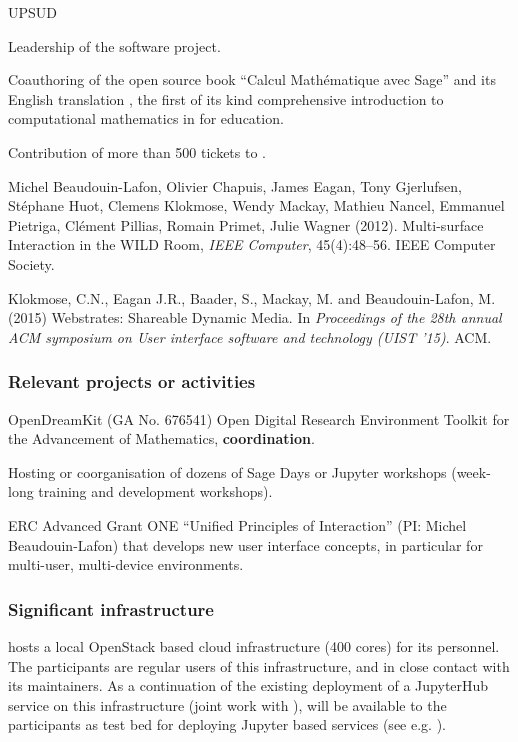 \begin{sitedescription}{UPSUD}
\begin{compactenum}
\item Leadership of the \SageCombinat software project.
\item Coauthoring of the open source book ``Calcul Mathématique avec
  Sage'' and its English translation , the first of its kind
  comprehensive introduction to computational mathematics in \Sage for
  education.
\item Contribution of more than 500 tickets to \Sage.
\item
Michel Beaudouin-Lafon, Olivier Chapuis, James Eagan, Tony Gjerlufsen, Stéphane Huot, Clemens Klokmose, Wendy Mackay, Mathieu Nancel, Emmanuel Pietriga, Clément Pillias, Romain Primet, Julie Wagner (2012). Multi-surface Interaction in the WILD Room, \emph{IEEE Computer}, 45(4):48–56. IEEE Computer Society.
\item
Klokmose, C.N., Eagan J.R., Baader, S., Mackay, M. and Beaudouin-Lafon, M. (2015) Webstrates: Shareable Dynamic Media. In \emph{Proceedings of the 28th annual ACM symposium on User interface software and technology (UIST ’15)}. ACM.
\end{compactenum}

\subsubsection*{Relevant projects or activities}

\begin{compactenum}
\item OpenDreamKit (GA No. 676541) Open Digital Research Environment
  Toolkit for the Advancement of Mathematics, \textbf{coordination}.
\item Hosting or coorganisation of dozens of Sage Days or Jupyter workshops (week-long training and development workshops).
\item {}
  ERC Advanced Grant ONE ``Unified Principles of Interaction'' (PI: Michel Beaudouin-Lafon) that develops new user interface concepts, in particular for multi-user, multi-device environments.
\end{compactenum}

\subsubsection*{Significant infrastructure}

 hosts a local OpenStack based cloud infrastructure
 (400 cores) for its personnel. The participants
are regular users of this infrastructure, and in close contact with
its maintainers. As a continuation of the existing deployment of a
JupyterHub service on this infrastructure (joint work with ),  will be
available to the participants as test bed for deploying Jupyter based
services (see e.g. ).


\end{sitedescription}
